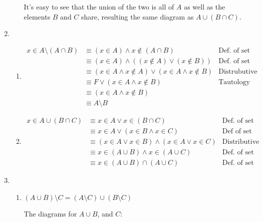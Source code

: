\documentclass{article}
\begin{document}
\begin{enumerate}
\begin{enumerate}
  It's easy to see that the union of the two is all of $A$ as well as the elements $B$ and $C$ share, resulting the same diagram as $A \cup (B \cap C)$.
  \end{enumerate}
\item
  \begin{enumerate}
  \item
    \begin{equation*}
      \begin{aligned}
	x \in A \setminus (A \cap B) &\equiv (x \in A) \land x \notin (A \cap B) & \text{Def. of set difference} \\
	&\equiv (x \in A) \land ((x \notin A) \lor (x \notin B)) & \text{Def. of set intersect}\\
	&\equiv (x \in A \land x \notin A) \lor (x \in A \land x \notin B) & \text{Distrubutive rule}\\
	&\equiv F \lor (x \in A \land x \notin B) & \text{Tautology}\\
	&\equiv (x \in A \land x \notin B) \\
	&\equiv A \setminus B
      \end{aligned}
    \end{equation*}
  \item
    \begin{equation*}
      \begin{aligned}
        x \in A \cup (B \cap C) &\equiv x \in A \lor x \in (B \cap C) & \text{Def. of set union} \\
        &\equiv x \in A \lor (x \in B \land x \in C) & \text{Def of set intersect}\\
        &\equiv (x \in A \lor x \in B) \land (x \in A \lor x \in C) & \text{Distributive rule}\\
        &\equiv x \in (A \cup B) \land x \in (A \cup C) & \text{Def. of set union} \\
        &\equiv x \in (A \cup B) \cap (A \cup C) & \text{Def. of set intersect}
        \end{aligned}
      \end{equation*}
  \end{enumerate}
  \pagebreak
\item
  \begin{enumerate}
    \item
  $(A \cup B) \setminus C = (A \setminus C) \cup (B \setminus C)$

  The diagrams for $A \cup B$, and $C$:

\end{enumerate}
\end{enumerate}
\end{document}
